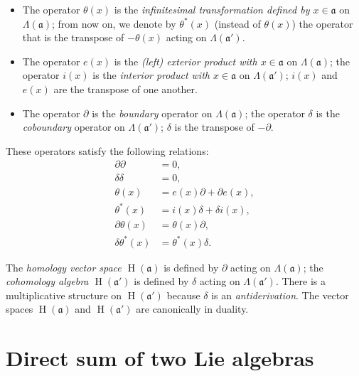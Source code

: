 \documentclass{article}
\newcommand{\fk}{\mathfrak}
\DeclareMathOperator{\HH}{H}
\begin{document}
\begin{itemize}
  \item The operator $\theta(x)$ is the \emph{infinitesimal transformation defined by $x\in\fk{a}$} on $\Lambda(\fk{a})$;
    from now on, we denote by $\theta^*(x)$ (instead of $\theta(x)$) the operator that is the transpose of $-\theta(x)$ acting on $\Lambda(\fk{a}')$.
  \item  The operator $e(x)$ is the \emph{(left) exterior product with $x\in\fk{a}$} on $\Lambda(\fk{a})$;
    the operator $i(x)$ is the \emph{interior product with $x\in\fk{a}$} on $\Lambda(\fk{a}')$;
    $i(x)$ and $e(x)$ are the transpose of one another.
  \item The operator $\partial$ is the \emph{boundary} operator on $\Lambda(\fk{a})$;
    the operator $\delta$ is the \emph{coboundary} operator on $\Lambda(\fk{a}')$;
    $\delta$ is the transpose of $-\partial$.
\end{itemize}

These operators satisfy the following relations:
\[
\label{equation-II.1}
  \begin{aligned}
    \partial\partial &= 0,
  \\\delta\delta &= 0,
  \\\theta(x) &= e(x)\partial+\partial e(x),
  \\\theta^*(x) &= i(x)\delta+\delta i(x),
  \\\partial\theta(x) &= \theta(x)\partial,
  \\\delta\theta^*(x) &= \theta^*(x)\delta.
  \end{aligned}
\tag{1}
\]

The \emph{homology vector space $\HH(\fk{a})$} is defined by $\partial$ acting on $\Lambda(\fk{a})$;
the \emph{cohomology algebra $\HH(\fk{a}')$} is defined by $\delta$ acting on $\Lambda(\fk{a'})$.
There is a multiplicative structure on $\HH(\fk{a}')$ because $\delta$ is an \emph{antiderivation}.
The vector spaces $\HH(\fk{a})$ and $\HH(\fk{a}')$ are canonically in duality.


\section{Direct sum of two Lie algebras}
\label{II.2}
\end{document}
